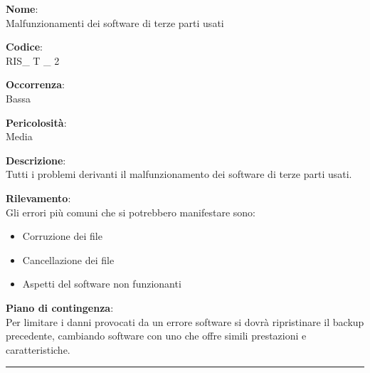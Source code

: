 {\setlength{\parindent}{0cm}
\begin{minipage}{\textwidth} 
\begin{multicols}{4}
\textbf{Nome}: \\ Malfunzionamenti dei software di terze parti usati \columnbreak

\textbf{Codice}: \\ RIS\_ T \_ 2 
\columnbreak

\textbf{Occorrenza}: \\ Bassa
\columnbreak

\textbf{Pericolosità}: \\ Media

\end{multicols}

\begin{multicols}{3}

\textbf{Descrizione}: \\ Tutti i problemi derivanti il malfunzionamento dei software di terze parti usati.
\columnbreak

\textbf{Rilevamento}: \\ Gli errori più comuni che si potrebbero manifestare sono:
\begin{itemize}
	\item Corruzione dei file
	\item Cancellazione dei file
	\item Aspetti del software non funzionanti
\end{itemize}

\columnbreak

\textbf{Piano di contingenza}: \\ Per limitare i danni provocati da un errore software si dovrà ripristinare il backup precedente, cambiando software con uno che offre simili prestazioni e caratteristiche.\\

\columnbreak
\end{multicols}
\end{minipage}}

\noindent\rule{\textwidth}{1pt}\\

